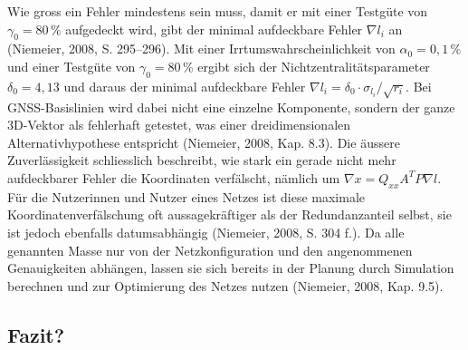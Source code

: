 Wie gross ein Fehler mindestens sein muss, damit er mit einer Testgüte von $\gamma_0 = 80\,\%$ aufgedeckt wird, gibt der minimal aufdeckbare Fehler $\nabla l_i$ an (Niemeier, 2008, S. 295--296).
Mit einer Irrtumswahrscheinlichkeit von $\alpha_0 = 0{,}1\,\%$ und einer Testgüte von $\gamma_0 = 80\,\%$ ergibt sich der Nichtzentralitätsparameter $\delta_0 = 4{,}13$ und daraus der minimal aufdeckbare Fehler $\nabla l_i = \delta_0 \cdot \sigma_{l_i} / \sqrt{r_i}$. 
Bei GNSS-Basislinien wird dabei nicht eine einzelne Komponente, sondern der ganze 3D-Vektor als fehlerhaft getestet, was einer dreidimensionalen Alternativhypothese entspricht (Niemeier, 2008, Kap. 8.3). 
Die äussere Zuverlässigkeit schliesslich beschreibt, wie stark ein gerade nicht mehr aufdeckbarer Fehler die Koordinaten verfälscht, nämlich um $\nabla x = Q_{xx} A^T P \nabla l$. 
Für die Nutzerinnen und Nutzer eines Netzes ist diese maximale Koordinatenverfälschung oft aussagekräftiger als der Redundanzanteil selbst, sie ist jedoch ebenfalls datumsabhängig (Niemeier, 2008, S. 304 f.). 
Da alle genannten Masse nur von der Netzkonfiguration und den angenommenen Genauigkeiten abhängen, lassen sie sich bereits in der Planung durch Simulation berechnen und zur Optimierung des Netzes nutzen (Niemeier, 2008, Kap. 9.5).

\subsection{Fazit?}
\label{sec:Fazit?}